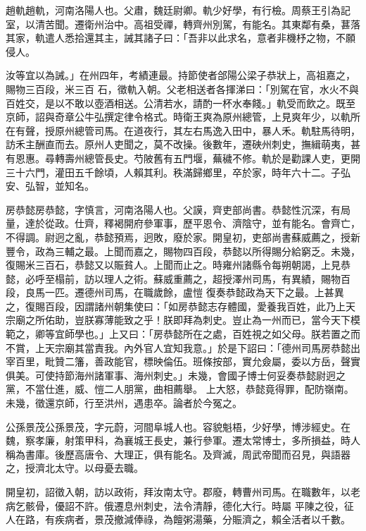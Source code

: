 \begin{pinyinscope}
 趙軌趙軌，河南洛陽人也。父肅，魏廷尉卿。軌少好學，有行檢。周蔡王引為記室，以清苦聞。遷衛州治中。高祖受禪，轉齊州別駕，有能名。其東鄰有桑，葚落其家，軌遣人悉拾還其主，誡其諸子曰：「吾非以此求名，意者非機杼之物，不願侵人。



 汝等宜以為誡。」在州四年，考績連最。持節使者郃陽公梁子恭狀上，高祖嘉之，賜物三百段，米三百
 石，徵軌入朝。父老相送者各揮涕曰：「別駕在官，水火不與百姓交，是以不敢以壺酒相送。公清若水，請酌一杯水奉餞。」軌受而飲之。既至京師，詔與奇章公牛弘撰定律令格式。時衛王爽為原州總管，上見爽年少，以軌所在有聲，授原州總管司馬。在道夜行，其左右馬逸入田中，暴人禾。軌駐馬待明，訪禾主酬直而去。原州人吏聞之，莫不改操。後數年，遷硤州刺史，撫緝萌夷，甚有恩惠。尋轉壽州總管長史。芍陂舊有五門堰，蕪穢不修。軌於是勸課人吏，更開三十六門，灌田五千餘頃，人賴其利。秩滿歸鄉里，卒於家，時年六十二。子弘安、弘智，並知名。



 房恭懿房恭懿，字慎言，河南洛陽人也。父謨，齊吏部尚書。恭懿性沉深，有局量，達於從政。仕齊，釋褐開府參軍事，歷平恩令、濟陰守，並有能名。會齊亡，不得調。尉迥之亂，恭懿預焉，迥敗，廢於家。開皇初，吏部尚書蘇威薦之，授新豐令，政為三輔之最。上聞而嘉之，賜物四百段，恭懿以所得賜分給窮乏。未幾，復賜米三百石，恭懿又以賑貧人。上聞而止之。時雍州諸縣令每朔朝謁，上見恭懿，必呼至榻前，訪以理人之術。蘇威重薦之，超授澤州司馬，有異績，賜物百段，良馬一匹。遷德州司馬，在職歲餘，盧愷
 復奏恭懿政為天下之最。上甚異之，復賜百段，因謂諸州朝集使曰：「如房恭懿志存體國，愛養我百姓，此乃上天宗廟之所佑助，豈朕寡薄能致之乎！朕即拜為刺史。豈止為一州而已，當今天下模範之，卿等宜師學也。」上又曰：「房恭懿所在之處，百姓視之如父母。朕若置之而不賞，上天宗廟其當責我。內外官人宜知我意。」於是下詔曰：「德州司馬房恭懿出宰百里，毗贊二籓，善政能官，標映倫伍。班條按部，實允僉屬，委以方岳，聲實俱美。可使持節海州諸軍事、海州刺史。」未幾，會國子博士何妥奏恭懿尉迥之黨，不當仕進，威、愷二人朋黨，曲相薦舉。
 上大怒，恭懿竟得罪，配防嶺南。未幾，徵還京師，行至洪州，遇患卒。論者於今冤之。



 公孫景茂公孫景茂，字元蔚，河間阜城人也。容貌魁梧，少好學，博涉經史。在魏，察孝廉，射策甲科，為襄城王長史，兼行參軍。遷太常博士，多所損益，時人稱為書庫。後歷高唐令、大理正，俱有能名。及齊滅，周武帝聞而召見，與語器之，授濟北太守。以母憂去職。



 開皇初，詔徵入朝，訪以政術，拜汝南太守。郡廢，轉曹州司馬。在職數年，以老病乞骸骨，優詔不許。俄遷息州刺史，法令清靜，德化大行。時屬
 平陳之役，征人在路，有疾病者，景茂撤減俸祿，為饘粥湯藥，分賑濟之，賴全活者以千數。




\end{pinyinscope}
